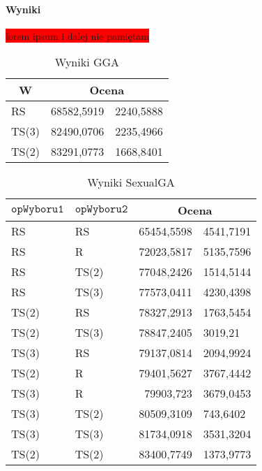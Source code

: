 \documentclass[twoside]{iisthesis}
\newcommand{\todo}{\colorbox{red}}
\newcommand{\param}[1]{\mathtt{#1}}
\begin{document}
\paragraph{Wyniki} \todo{lorem ipsum i dalej nie pamiętam}

\begin{table}[h]
	\caption{Wyniki GGA \label{table:tsp_results_gga}}
	\centering
	\begin{tabular}{|l|r@{$\pm$}l|}
		\hline
		\multicolumn{1}{|c|}{{\bf W}} & \multicolumn{2}{c|}{{\bf Ocena}} \\ \hline \hline
		RS & 68582,5919 & 2240,5888 \\ \hline
		TS(3) & 82490,0706 & 2235,4966 \\ \hline
		TS(2) & 83291,0773 & 1668,8401 \\ \hline
	\end{tabular}
\end{table}

\begin{table}[h]
	\caption{Wyniki SexualGA \label{table:tsp_results_sexual_ga}}
	\centering
	\begin{tabular}{|l|l|r@{$\pm$}l|}
		\hline
		\multicolumn{1}{|c|}{{\bf $\param{opWyboru1}$}} & \multicolumn{1}{c|}{{\bf $\param{opWyboru2}$}} & \multicolumn{2}{c|}{{\bf Ocena}} \\ \hline \hline
		RS & RS & 65454,5598 & 4541,7191 \\ \hline
		RS & R & 72023,5817 & 5135,7596 \\ \hline
		RS & TS(2) & 77048,2426 & 1514,5144 \\ \hline
		RS & TS(3) & 77573,0411 & 4230,4398 \\ \hline
		TS(2) & RS & 78327,2913 & 1763,5454 \\ \hline
		TS(2) & TS(3) & 78847,2405 & 3019,21 \\ \hline
		TS(3) & RS & 79137,0814 & 2094,9924 \\ \hline
		TS(2) & R & 79401,5627 & 3767,4442 \\ \hline
		TS(3) & R & 79903,723 & 3679,0453 \\ \hline
		TS(3) & TS(2) & 80509,3109 & 743,6402 \\ \hline
		TS(3) & TS(3) & 81734,0918 & 3531,3204 \\ \hline
		TS(2) & TS(2) & 83400,7749 & 1373,9773 \\ \hline

	\end{tabular}
\end{table}
\end{document}
